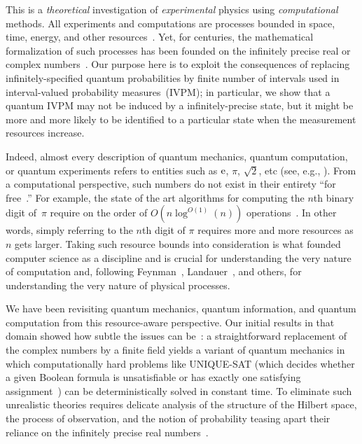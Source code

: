 \documentclass[12pt]{iopart}
\theoremstyle{plain}
\theoremstyle{definition}
\theoremstyle{remark}
\begin{document}
This is a \emph{theoretical} investigation of \emph{experimental}
physics using \emph{computational} methods. All experiments and computations
are processes bounded in space, time, energy, and other resources~\cite{Jaeger2007,Piccinini2015}.
Yet, for centuries, the mathematical formalization of such processes
has been founded on the infinitely precise real or complex numbers~\cite{Ziegler2007,weihrauch2012computable,blum2012complexity}.
Our purpose here is to exploit the consequences of replacing infinitely-specified
quantum probabilities by finite number of intervals used in interval-valued
probability measures~(IVPM); in particular, we show that a quantum
IVPM may not be induced by a infinitely-precise state, but it might
be more and more likely to be identified to a particular state when
the measurement resources increase.

Indeed, almost every description of quantum mechanics, quantum computation,
or quantum experiments refers to entities such as $\mathrm{e}$, $\pi$,
$\sqrt{2}$, etc (see, e.g., \cite{Redhead1987-REDINA,544199,Mermin2007}).
From a computational perspective, such numbers do not exist in their
entirety ``for free~\cite{Kent1999,CliftonKent2000}.'' For example,
the state of the art algorithms for computing the $n$th binary digit
of~$\pi$ require on the order of $O\left(n\log^{O\left(1\right)}\left(n\right)\right)$
operations~\cite{journals/moc/BaileyBP97}. In other words, simply
referring to the $n$th digit of $\pi$ requires more and more resources
as $n$ gets larger. Taking such resource bounds into consideration
is what founded computer science as a discipline and is crucial for
understanding the very nature of computation and, following Feynman~\cite{Feynman1982Simulating},
Landauer~\cite{Landauer1996188}, and others, for understanding the
very nature of physical processes.

We have been revisiting quantum mechanics, quantum information, and
quantum computation from this resource-aware perspective. Our initial
results in that domain showed how subtle the issues can be~\cite{usat,geometry2013,DQT2014}:
a straightforward replacement of the complex numbers by a finite field
yields a variant of quantum mechanics in which computationally hard
problems like UNIQUE-SAT (which decides whether a given Boolean formula
is unsatisfiable or has exactly one satisfying assignment~\cite{Valiant198685,Papadimitriou1993,AroraBarak2009})
can be deterministically solved in constant time. To eliminate such
unrealistic theories requires delicate analysis of the structure of
the Hilbert space, the process of observation, and the notion of probability
teasing apart their reliance on the infinitely precise real numbers~\cite{geometry2013,DQT2014}. 
\end{document}
